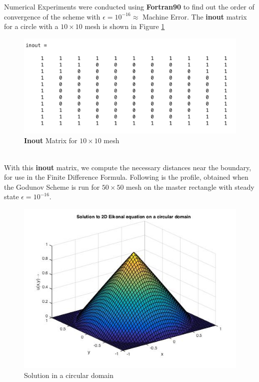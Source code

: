 		\noindent
		Numerical Experiments were conducted using \textbf{Fortran90} to find out the order of convergence of the scheme with $\epsilon = 10^{-16} \approx$ Machine Error. The \textbf{inout} matrix for a circle with a $10 \times 10$ mesh is shown in Figure \ref{fig:11}
		\begin{figure}[h!]
			\centering
			\includegraphics[scale=0.5]{Images/inout.png}
			\caption{\textbf{Inout} Matrix for $10 \times 10$ mesh}
			\label{fig:11}
			\end{figure}\\
			\noindent
			With this \textbf{inout} matrix, we compute the necessary distances near the boundary, for use in the Finite Difference Formula. Following is the profile, obtained when the Godunov Scheme is run for $50 \times 50$ mesh on the master rectangle with steady state $\epsilon = 10^{-16}$.
			\begin{figure}[h!]
				\centering
				\includegraphics[scale = 0.5]{Images/2D_eik_circle.jpg}
				\caption{Solution in a circular domain}
				\label{fig:5}
				\end{figure}\\
				
